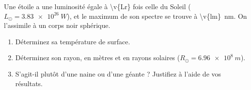Une étoile a une luminosité égale à \num{\v{Lr}} fois celle du Soleil ($L_\odot = \qty{3.83e26}{W}$), et le maximum de son spectre se trouve à \qty{\v{lm}}{nm}. On l'assimile à un corps noir sphérique.

\begin{enumerate}[label=\alph*)]
    \item Déterminez sa température de surface.
    \item Déterminez son rayon, en mètres et en rayons solaires ($R_\odot = \qty{6.96e8}{m}$).
    \item S'agit-il plutôt d'une naine ou d'une géante ? Justifiez à l'aide de vos résultats.
\end{enumerate}
